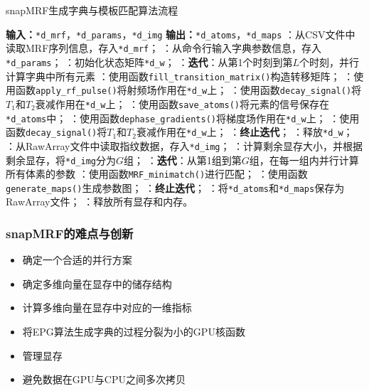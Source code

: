 \documentclass{beamer}
\newcommand{\INDSTATE}[1][1]{\STATE\hspace{#1\algorithmicindent}}
\begin{document}
\begin{frame}
{\begin{minipage}{0.5\linewidth}
	\end{minipage}
	\hspace{1.5cm}
	\begin{minipage}{1.2\linewidth}
	\begin{algorithm}[H]
	\caption{snapMRF生成字典与模板匹配算法流程}
	\label{alg:snapMRF}
	\begin{algorithmic}
		\INDSTATE[-1] \textbf{输入：}\texttt{*d\_mrf}，\texttt{*d\_params}，\texttt{*d\_img}
		\INDSTATE[-1] \textbf{输出：}\texttt{*d\_atoms}，\texttt{*d\_maps}
		：从CSV文件中读取MRF序列信息，存入\texttt{*d\_mrf}；
		：从命令行输入字典参数信息，存入\texttt{*d\_params}；
		：初始化状态矩阵\texttt{*d\_w}；
		：\textbf{迭代}：从第1个时刻到第$L$个时刻，并行计算字典中所有元素
		：\qquad 使用函数\texttt{fill\_transition\_matrix()}构造转移矩阵；
		：\qquad 使用函数\texttt{apply\_rf\_pulse()}将射频场作用在\texttt{*d\_w}上；
		：\qquad 使用函数\texttt{decay\_signal()}将$T_1$和$T_2$衰减作用在\texttt{*d\_w}上；
		：\qquad 使用函数\texttt{save\_atoms()}将元素的信号保存在\texttt{*d\_atoms}中；
		：\qquad 使用函数\texttt{dephase\_gradients()}将梯度场作用在\texttt{*d\_w}上；
		：\qquad 使用函数\texttt{decay\_signal()}将$T_1$和$T_2$衰减作用在\texttt{*d\_w}上；
		：\textbf{终止迭代}；
		：释放\texttt{*d\_w}；
		：从RawArray文件中读取指纹数据，存入\texttt{*d\_img}；
		：计算剩余显存大小，并根据剩余显存，将\texttt{*d\_img}分为$G$组；
		：\textbf{迭代}：从第1组到第$G$组，在每一组内并行计算所有体素的参数
		：\qquad 使用函数\texttt{MRF\_minimatch()}进行匹配；
		：\qquad 使用函数\texttt{generate\_maps()}生成参数图；
		：\textbf{终止迭代}；
		：将\texttt{*d\_atoms}和\texttt{*d\_maps}保存为RawArray文件；
		：释放所有显存和内存。
	\end{algorithmic}
\end{algorithm}
\end{minipage}}
\end{frame}

\begin{frame}
	\frametitle{snapMRF的难点与创新}
	\begin{itemize}
		\item 确定一个合适的并行方案
		\item 确定多维向量在显存中的储存结构
		\item 计算多维向量在显存中对应的一维指标
		\item 将EPG算法生成字典的过程分裂为小的GPU核函数
		\item 管理显存
		\item 避免数据在GPU与CPU之间多次拷贝
	\end{itemize}
\end{frame}
\end{document}
